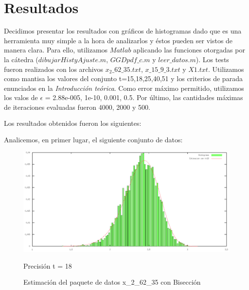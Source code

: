 \documentclass[10pt, a4paper]{article}
\begin{document}
\section{Resultados}

Decidimos presentar los resultados con gr\'aficos de histogramas dado que es una herramienta muy simple a la hora de analizarlos y \'estos pueden ser vistos de manera clara. Para ello, utilizamos $Matlab$ aplicando las funciones otorgadas por la c\'atedra ($dibujarHistyAjuste.m$, $GGDpdf\_c.m$ y $leer\_datos.m$).\newline
Los tests fueron realizados con los archivos $x_2\_62\_35.txt$, $x\_15\_9\_3.txt$ y $ X1.txt$. Utilizamos como mantisa los valores del conjunto t={15,18,25,40,51} y los criterios de parada enunciados en la \textit{Introducci\'on te\'orica}. Como error m\'aximo permitido, utilizamos los valos de $\epsilon$ = {2.88e-005, 1e-10, 0.001, 0.5}. Por \'ultimo, las cantidades m\'aximas de iteraciones evaluadas fueron 4000, 2000 y 500.\newline

Los resultados obtenidos fueron los siguientes:\newline

Analicemos, en primer lugar, el siguiente conjunto de datos:

\begin{figure}[H]
\begin{center}
\includegraphics[width=370pt]{./Biseccion_18.png}
\caption[h]{Estimaci\'on del paquete de datos x\_2\_62\_35 con Bisecci\'on}{Precisi\'on t = 18}
\end{center}
\end{figure}
\end{document}
